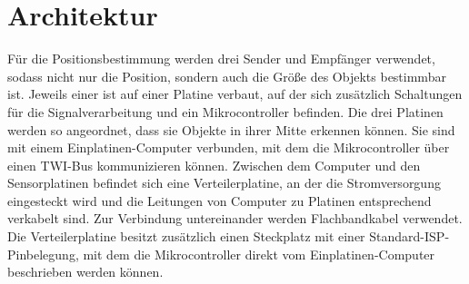 \section{Architektur} %
Für die Positionsbestimmung werden drei Sender und Empfänger verwendet, sodass nicht nur die Position, sondern auch die Größe des Objekts bestimmbar ist. Jeweils einer ist auf einer Platine verbaut, auf der sich zusätzlich Schaltungen für die Signalverarbeitung und ein Mikrocontroller befinden. Die drei Platinen werden so angeordnet, dass sie Objekte in ihrer Mitte erkennen können. Sie sind mit einem Einplatinen-Computer verbunden, mit dem die Mikrocontroller über einen \ac{TWI}-Bus kommunizieren können. Zwischen dem Computer und den Sensorplatinen befindet sich eine Verteilerplatine, an der die Stromversorgung eingesteckt wird und die Leitungen von Computer zu Platinen entsprechend verkabelt sind.
Zur Verbindung untereinander werden Flachbandkabel verwendet. Die Verteilerplatine besitzt zusätzlich einen Steckplatz mit einer Standard-\ac{ISP}-Pinbelegung, mit dem die Mikrocontroller direkt vom Einplatinen-Computer beschrieben werden können.\\
